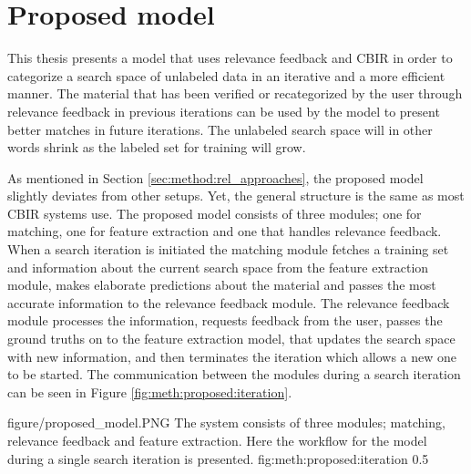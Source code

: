 \section{Proposed model}
\label{sec:method:proposed}
This thesis presents a model that uses relevance feedback and CBIR in order to categorize a search space of unlabeled data in an iterative and a more efficient manner. The material that has been verified or recategorized by the user through relevance feedback in previous iterations can be used by the model to present better matches in future iterations. The unlabeled search space will in other words shrink as the labeled set for training will grow.

As mentioned in Section \ref{sec:method:rel_approaches}, the proposed model slightly deviates from other setups. Yet, the general structure is the same as most CBIR systems use. The proposed model consists of three modules; one for matching, one for feature extraction and one that handles relevance feedback. When a search iteration is initiated the matching module fetches a training set and information about the current search space from the feature extraction module, makes elaborate predictions about the material and passes the most accurate information to the relevance feedback module. The relevance feedback module processes the information, requests feedback from the user, passes the ground truths on to the feature extraction model, that updates the search space with new information, and then terminates the iteration which allows a new one to be started. The communication between the modules during a search iteration can be seen in Figure \ref{fig:meth:proposed:iteration}. 

\singlefigure
{figure/proposed_model.PNG}
{The system consists of three modules; matching, relevance feedback and feature extraction. Here the workflow for the model during a single search iteration is presented.}
{fig:meth:proposed:iteration}
{0.5}




